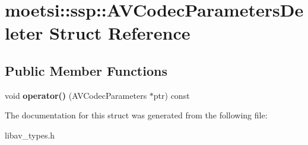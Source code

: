 \hypertarget{structmoetsi_1_1ssp_1_1AVCodecParametersDeleter}{}\section{moetsi\+:\+:ssp\+:\+:A\+V\+Codec\+Parameters\+Deleter Struct Reference}
\label{structmoetsi_1_1ssp_1_1AVCodecParametersDeleter}
\subsection*{Public Member Functions}
\begin{DoxyCompactItemize}
\item 
\mbox{\label{structmoetsi_1_1ssp_1_1AVCodecParametersDeleter_a17d8e18acf325964c27dad7d28329840}} 
void {\bfseries operator()} (A\+V\+Codec\+Parameters $\ast$ptr) const
\end{DoxyCompactItemize}


The documentation for this struct was generated from the following file\+:\begin{DoxyCompactItemize}
\item 
libav\+\_\+types.\+h\end{DoxyCompactItemize}
